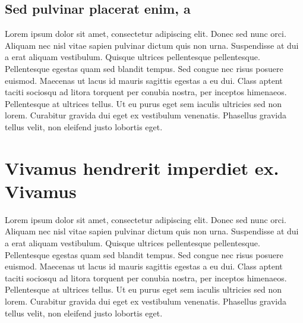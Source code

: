 \subsection{Sed pulvinar placerat enim, a}
\label{sec:00456} Lorem ipsum dolor sit amet, consectetur adipiscing elit. Donec
sed nunc orci. Aliquam nec nisl vitae sapien pulvinar dictum quis non urna. Suspendisse
at dui a erat aliquam vestibulum. Quisque ultrices pellentesque pellentesque. Pellentesque
egestas quam sed blandit tempus. Sed congue nec risus posuere euismod. Maecenas ut
lacus id mauris sagittis egestas a eu dui. Class aptent taciti sociosqu ad
litora torquent per conubia nostra, per inceptos himenaeos. Pellentesque at
ultrices tellus. Ut eu purus eget sem iaculis ultricies sed non lorem. Curabitur
gravida dui eget ex vestibulum venenatis. Phasellus gravida tellus velit, non
eleifend justo lobortis eget.

\section{Vivamus hendrerit imperdiet ex. Vivamus}
\label{sec:123} Lorem ipsum dolor sit amet, consectetur adipiscing elit. Donec
sed nunc orci. Aliquam nec nisl vitae sapien pulvinar dictum quis non urna.
Suspendisse at dui a erat aliquam vestibulum. Quisque ultrices pellentesque pellentesque.
Pellentesque egestas quam sed blandit tempus. Sed congue nec risus posuere euismod.
Maecenas ut lacus id mauris sagittis egestas a eu dui. Class aptent taciti sociosqu
ad litora torquent per conubia nostra, per inceptos himenaeos. Pellentesque at ultrices
tellus. Ut eu purus eget sem iaculis ultricies sed non lorem. Curabitur gravida dui
eget ex vestibulum venenatis. Phasellus gravida tellus velit, non eleifend justo
lobortis eget.